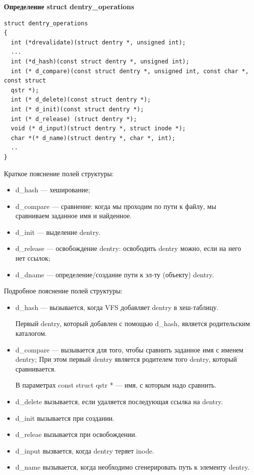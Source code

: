 \textbf{Определение struct dentry\_operations}

\begin{lstlisting}
struct dentry_operations
{
  int (*drevalidate)(struct dentry *, unsigned int);
  ...
  int (*d_hash)(const struct dentry *, unsigned int);
  int (* d_compare)(const struct dentry *, unsigned int, const char *, const struct
  qstr *);
  int (* d_delete)(const struct dentry *);
  int (* d_init)(const struct dentry *);
  int (* d_release) (struct dentry *);
  void (* d_input)(struct dentry *, struct inode *);
  char *(* d_name)(struct dentry *, char *, int);
  ..
}
\end{lstlisting}

Краткое пояснение полей структуры:
\begin{itemize}
\item d\_hash — хеширование;
\item d\_compare — сравнение: когда мы проходим по пути к файлу, мы сравниваем заданное имя и найденное.
\item d\_init — выделение dentry.
\item d\_release — освобождение dentry: освободить dentry можно, если на него нет ссылок;
\item d\_dname — определение/создание пути к эл-ту (объекту) dentry.
\end{itemize}

Подробное пояснение полей структуры:
\begin{itemize}
\item d\_hash — вызывается, когда VFS добавляет dentry в хеш-таблицу.

Первый dentry, который добавлен с помощью d\_hash, является родительским каталогом.
\item d\_compare — вызывается для того, чтобы сравнить заданное имя с именем dentry; При этом первый dentry является родителем того dentry, который сравнивается.

В параметрах const struct qstr * — имя, с которым надо сравнить.
\item d\_delete вызывается, если удаляется последующая ссылка на dentry.
\item d\_init вызывается при создании.
\item d\_releae вызывается при освобождении.
\item d\_input вызвается, когда dentry теряет inode.
\item d\_name вызывается, когда необходимо сгенерировать путь к элементу dentry.
\end{itemize}

